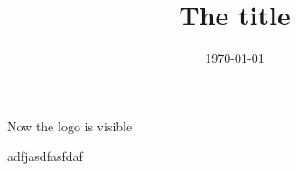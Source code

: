 \documentclass{beamer}
\title{The title}
\author[\autor]{\autor}
\institute[\instituto]{\instituto}
\date{\today}
\begin{document}
\begin{frame}
\maketitle
\end{frame}


\begin{frame}
Now the logo is visible
\end{frame}

\begin{frame}
    adfjasdfasfdaf
\end{frame}
\end{document}
